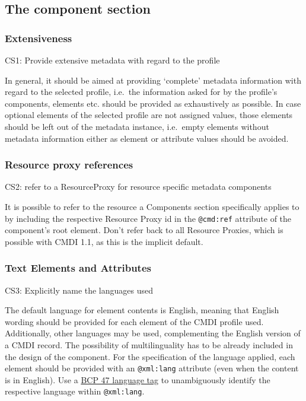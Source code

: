 \subsection{The component section}\label{the-component-section}

\subsubsection{Extensiveness}\label{extensiveness}

CS1: Provide extensive metadata with regard to the profile


In general, it should be aimed at providing `complete' metadata information with regard to the selected profile, i.e.~the information asked for by the profile's components, elements etc. should be provided as exhaustively as possible. In case optional elements of the selected profile are not assigned values, those elements should be left out of the metadata instance, i.e.~empty elements without metadata information either as element or attribute values should be avoided.

\subsubsection{Resource proxy
references}\label{resource-proxy-references}

\label{cs2}
CS2: refer to a ResourceProxy for resource specific metadata components


It is possible to refer to the resource a Components section
specifically applies to by including the respective Resource Proxy id in the \texttt{@cmd:ref} attribute of the component's root element. Don't refer back to all Resource Proxies, which is possible with CMDI 1.1, as this is the implicit default.

\subsubsection{Text Elements and Attributes} \label{text-elements-attributes}

\label{cs3}
CS3: Explicitly name the languages used

 


The default language for element contents is English, meaning that English wording should be provided for each element of the CMDI profile used. Additionally, other languages may be used, complementing the English version of a CMDI record. The possibility of multilinguality has to be already included in the design of the component. For the specification of the language applied, each element should be provided with an \texttt{@xml:lang} attribute (even when the content is in
English). Use a \href{https://tools.ietf.org/rfc/bcp/bcp47.txt}{BCP 47 language tag} to unambiguously identify the respective language within \texttt{@xml:lang}.

